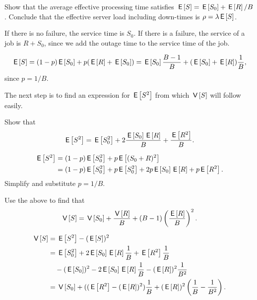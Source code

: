 \begin{exercise}[\faCalculator]
  Show that the average effective processing time satisfies $ \E{S} = \E{S_0} + \E R/B$. Conclude that the effective server load including down-times is $\rho = \lambda \E{S}$. 
\begin{hint}
If there is no failure, the service time is $S_0$. If there is a failure, the service of a job is $R + S_0$, since we add the outage time to the service time of the job. 
\end{hint}
  \begin{solution}
    \begin{equation*}
      \E{S} = (1-p)\E{S_0} + p (\E{R} + \E{S_0}) = \E{S_0} \frac{B-1}B + (\E{S_0} + \E R) \frac 1B,
    \end{equation*}
since $p=1/B$. 
  \end{solution}
\end{exercise}

The next step is to find an expression for $\E{S^2}$ from which $\V{S}$ will follow easily.

\begin{exercise}[\faCalculator]
  Show that
  \begin{equation*}
    \E{S^2} = \E{S_0^2} + 2\frac{\E{S_0}\E{R}} B + \frac{\E{R^2}}B.
  \end{equation*}
  \begin{solution}
  \begin{align*}
    \E{S^2} 
&= (1-p) \E{S_0^2} + p \E{(S_0+R)^2}\\
&= (1-p) \E{S_0^2} + p \E{S_0^2}  + 2 p \E{S_0} \E R + p \E{R^2}. 
  \end{align*}
  Simplify and substitute $p=1/B$. 
  \end{solution}
\end{exercise}

\begin{exercise}[\faCalculator]
  Use the above to find that
  \begin{equation*}
    \V{S} = \V{S_0} + \frac{\V{R}} B + (B-1)\left(\frac{\E R}{B}\right)^2.
  \end{equation*}
  \begin{solution}
    \begin{equation*}
      \begin{split}
\V{S} 
&=\E{S^2} - (\E{S})^2 \\
&= \E{S_0^2} + 2 \E{S_0} \E R\frac 1B + \E{R^2}\frac 1B  \\
&\quad - (\E{S_0})^2 - 2\E{S_0}\E R \frac 1 B - (\E R)^2\frac1{B^2}\\
&=  \V{S_0} + ((\E{R^2} - (\E R)^2)\frac 1 B + (\E R)^2\left(\frac 1B - \frac 1{B^2}\right).
      \end{split}
    \end{equation*}
  \end{solution}
\end{exercise}

